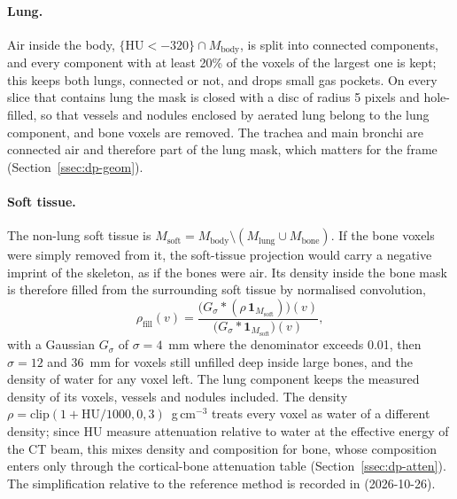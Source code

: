 \paragraph{Lung.} Air inside the body, $\{\mathrm{HU}<-320\}\cap M_{\mathrm{body}}$, is split into connected components, and every component with
at least 20\% of the voxels of the largest one is kept; this keeps both lungs, connected or not, and drops small gas pockets. On every slice that
contains lung the mask is closed with a disc of radius 5 pixels and hole-filled, so that vessels and nodules enclosed by aerated lung belong to the
lung component, and bone voxels are removed. The trachea and main bronchi are connected air and therefore part of the lung mask, which matters
for the frame (Section~\ref{ssec:dp-geom}).

\paragraph{Soft tissue.} The non-lung soft tissue is $M_{\mathrm{soft}}=M_{\mathrm{body}}\setminus(M_{\mathrm{lung}}\cup M_{\mathrm{bone}})$.
If the bone voxels were simply removed from it, the soft-tissue projection would carry a negative imprint of the skeleton, as if the bones were
air. Its density inside the bone mask is therefore filled from the surrounding soft tissue by normalised convolution,
\begin{equation}
  \rho_{\mathrm{fill}}(v) = \frac{\big(G_\sigma*(\rho\,\mathbf{1}_{M_{\mathrm{soft}}})\big)(v)}{\big(G_\sigma*\mathbf{1}_{M_{\mathrm{soft}}}\big)(v)},
  \label{eq:dp-fill}
\end{equation}
with a Gaussian $G_\sigma$ of $\sigma=4$~mm where the denominator exceeds 0.01, then $\sigma=12$ and 36~mm for voxels still unfilled deep inside
large bones, and the density of water for any voxel left. The lung component keeps the measured density of its voxels, vessels and nodules
included. The density $\rho=\mathrm{clip}(1+\mathrm{HU}/1000,0,3)$~g\,cm$^{-3}$ treats every voxel as water of a different density; since HU
measure attenuation relative to water at the effective energy of the CT beam, this mixes density and composition for bone, whose composition
enters only through the cortical-bone attenuation table (Section~\ref{ssec:dp-atten}). The simplification relative to the reference method is
recorded in  (2026-10-26).

